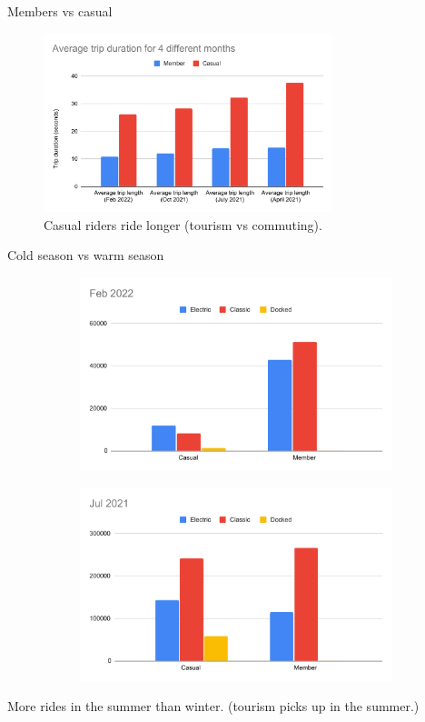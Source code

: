\documentclass{beamer}
\begin{document}
\begin{frame}{Members vs casual}
\begin{figure}
\includegraphics[width=0.75\textwidth]{Average Trip Duration}\\
Casual riders ride longer (tourism vs commuting).
\end{figure}
\end{frame}

\begin{frame}{Cold season vs warm season}
\begin{figure}
\begin{subfigure}{}
  \includegraphics[width=.5\textwidth]{Feb2022RideBreakdown}
\end{subfigure}%
\begin{subfigure}{}
  \includegraphics[width=.5\textwidth]{Jul2021RideBreakdown}
\end{subfigure}
\end{figure}
More rides in the summer than winter. (tourism picks up in the summer.)
\end{frame}
\end{document}
